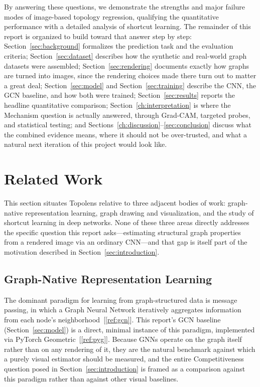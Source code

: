 \documentclass[11pt,letterpaper]{article}
\numberwithin{equation}{section}
\numberwithin{figure}{section}
\numberwithin{table}{section}
\begin{document}
By answering these questions, we demonstrate the strengths and major failure modes of image-based topology regression, qualifying the quantitative performance with a detailed analysis of shortcut learning. The remainder of this report is organized to build toward that answer step by step: Section~\ref{sec:background} formalizes the prediction task and the evaluation criteria; Section~\ref{sec:dataset} describes how the synthetic and real-world graph datasets were assembled; Section~\ref{sec:rendering} documents exactly how graphs are turned into images, since the rendering choices made there turn out to matter a great deal; Section~\ref{sec:model} and Section~\ref{sec:training} describe the CNN, the GCN baseline, and how both were trained; Section~\ref{sec:results} reports the headline quantitative comparison; Section~\ref{ch:interpretation} is where the Mechanism question is actually answered, through Grad-CAM, targeted probes, and statistical testing; and Sections~\ref{ch:discussion}--\ref{sec:conclusion} discuss what the combined evidence means, where it should not be over-trusted, and what a natural next iteration of this project would look like.

\section{Related Work}
\label{sec:relatedwork}
This section situates Topolens relative to three adjacent bodies of work: graph-native representation learning, graph drawing and visualization, and the study of shortcut learning in deep networks. None of these three areas directly addresses the specific question this report asks---estimating structural graph properties from a rendered image via an ordinary CNN---and that gap is itself part of the motivation described in Section~\ref{sec:introduction}.

\subsection{Graph-Native Representation Learning}
The dominant paradigm for learning from graph-structured data is message passing, in which a Graph Neural Network iteratively aggregates information from each node's neighborhood~[\ref{ref:gcn}]. This report's GCN baseline (Section~\ref{sec:model}) is a direct, minimal instance of this paradigm, implemented via PyTorch Geometric~[\ref{ref:pyg}]. Because GNNs operate on the graph itself rather than on any rendering of it, they are the natural benchmark against which a purely visual estimator should be measured, and the entire Competitiveness question posed in Section~\ref{sec:introduction} is framed as a comparison against this paradigm rather than against other visual baselines.
\end{document}
